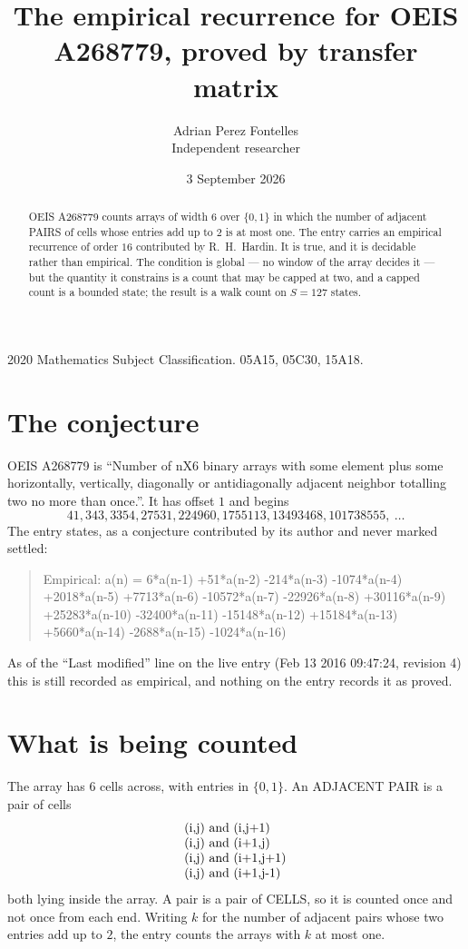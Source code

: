 \documentclass[11pt,a4paper]{article}
\title{The empirical recurrence for OEIS A268779, proved by transfer matrix}
\author{Adrian Perez Fontelles\\ \small Independent researcher}
\date{3 September 2026}
\theoremstyle{plain}
\theoremstyle{definition}
\begin{document}
\maketitle

\begin{abstract}
OEIS A268779 counts arrays of width $6$ over $\{0,1\}$ in which the number of adjacent PAIRS of
cells whose entries add up to $2$ is at most one. The entry carries an empirical recurrence of
order $16$ contributed by R.~H.~Hardin. It is true, and it is decidable rather than
empirical. The condition is global --- no window of the array decides it --- but the quantity
it constrains is a count that may be capped at two, and a capped count is a bounded state; the
result is a walk count on $S=127$ states.
\end{abstract}

\noindent\small 2020 Mathematics Subject Classification. 05A15, 05C30, 15A18.\normalsize

\section{The conjecture}

OEIS A268779 is ``Number of nX6 binary arrays with some element plus some horizontally, vertically, diagonally or antidiagonally adjacent neighbor totalling two no more than once.''. It has offset $1$ and begins
\[
41, 343, 3354, 27531, 224960, 1755113, 13493468, 101738555,\ \dots
\]
The entry states, as a conjecture contributed by its author and never marked settled:
\begin{quote}
Empirical: a(n) = 6*a(n-1) +51*a(n-2) -214*a(n-3) -1074*a(n-4) +2018*a(n-5) +7713*a(n-6) -10572*a(n-7) -22926*a(n-8) +30116*a(n-9) +25283*a(n-10) -32400*a(n-11) -15148*a(n-12) +15184*a(n-13) +5660*a(n-14) -2688*a(n-15) -1024*a(n-16)
\end{quote}
As of the ``Last modified'' line on the live entry (Feb 13 2016 09:47:24, revision 4) this is still
recorded as empirical, and nothing on the entry records it as proved.

\section{What is being counted}

The array has $6$ cells across, with entries in $\{0,1\}$. An ADJACENT PAIR is a pair of cells
\[
\begin{array}{l}
$(i,j)\text{ and }(i,j{+}1)$ \\
$(i,j)\text{ and }(i{+}1,j)$ \\
$(i,j)\text{ and }(i{+}1,j{+}1)$ \\
$(i,j)\text{ and }(i{+}1,j{-}1)$ \\
\end{array}
\]
both lying inside the array. A pair is a pair of CELLS, so it is counted once and not once from
each end. Writing $k$ for the number of adjacent pairs whose two entries add up to $2$, the
entry counts the arrays with $k$ at most one.
\end{document}
